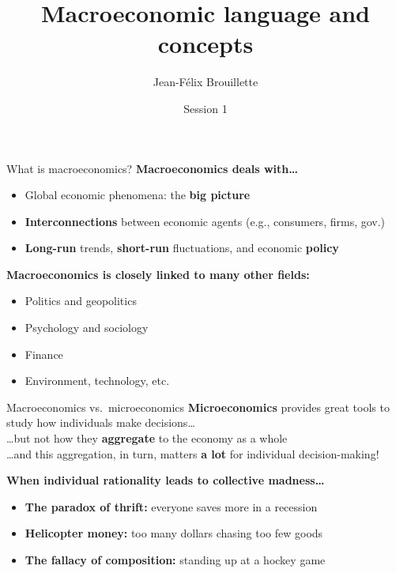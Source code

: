 \documentclass[aspectratio=169]{beamer}
\title{Macroeconomic language and concepts}
\author{Jean-F\'elix Brouillette}
\date{Session 1}
\begin{document}
\titleframe

\begin{frame}{What is macroeconomics?}
   \textbf{Macroeconomics deals with\ldots}
   \vspace{0.15cm}
   \begin{itemize}
      \setlength\itemsep{0.2cm}
      \item Global economic phenomena: the \textbf{big picture}
      \item \textbf{Interconnections} between economic agents (e.g., consumers, firms, gov.)
      \item \textbf{Long-run} trends, \textbf{short-run} fluctuations, and economic \textbf{policy}
   \end{itemize}
   \vspace{0.4cm}
   \textbf{Macroeconomics is closely linked to many other fields:}
   \vspace{0.15cm}
   \begin{itemize}
      \setlength\itemsep{0.15cm}
      \item Politics and geopolitics
      \item Psychology and sociology
      \item Finance
      \item Environment, technology, etc.
   \end{itemize}
\end{frame}

\begin{frame}{Macroeconomics vs.\ microeconomics}
   \textbf{Microeconomics} provides great tools to study how individuals make decisions\ldots
   \\[6pt]
   \ldots but not how they \textbf{aggregate} to the economy as a whole
   \\[6pt]
   \ldots and this aggregation, in turn, matters \textbf{a lot} for individual decision-making!
   \vspace{0.5cm}

   \textbf{When individual rationality leads to collective madness\ldots}
   \vspace{0.2cm}
   \begin{itemize}
      \setlength\itemsep{0.2cm}
      \item \textbf{The paradox of thrift:} everyone saves more in a recession
      \item \textbf{Helicopter money:} too many dollars chasing too few goods
      \item \textbf{The fallacy of composition:} standing up at a hockey game
   \end{itemize}
\end{frame}
\end{document}
